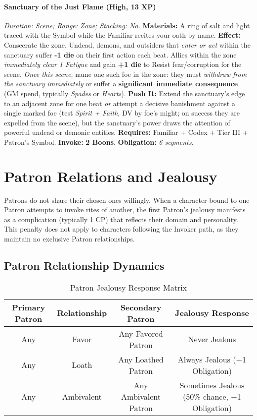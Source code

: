 \documentclass[12pt,twoside]{book}
\begin{document}
\paragraph{Sanctuary of the Just Flame (High, 13 XP)} \emph{Duration: Scene; Range: Zone; Stacking: No.}  
\textbf{Materials:} A ring of salt and light traced with the Symbol while the Familiar recites your oath by name.  
\textbf{Effect:} Consecrate the zone. Undead, demons, and outsiders that \emph{enter or act} within the sanctuary suffer \textbf{-1 die} on their first action each beat. Allies within the zone \emph{immediately clear 1 Fatigue} and gain \textbf{+1 die} to Resist fear/corruption for the scene. \emph{Once this scene,} name one such foe in the zone: they must \emph{withdraw from the sanctuary immediately} or suffer a \textbf{significant immediate consequence} (GM spend, typically \emph{Spades} or \emph{Hearts}).  
\textbf{Push It:} Extend the sanctuary's edge to an adjacent zone for one beat \emph{or} attempt a decisive banishment against a single marked foe (test \emph{Spirit + Faith}, DV by foe's might; on success they are expelled from the scene), but the sanctuary's power draws the attention of powerful undead or demonic entities.
\textbf{Requires:} Familiar + Codex + Tier III + Patron's Symbol. \;\; \textbf{Invoke:} \textbf{2 Boons}. \;\; \textbf{Obligation:} \emph{6 segments.}

\section{Patron Relations and Jealousy}

Patrons do not share their chosen ones willingly. When a character bound to one Patron attempts to invoke rites of another, the first Patron's jealousy manifests as a complication (typically 1 CP) that reflects their domain and personality. This penalty does not apply to characters following the Invoker path, as they maintain no exclusive Patron relationships.

\subsection{Patron Relationship Dynamics}

\begin{table}[htbp]
\centering
\begin{tabular}{|c|c|c|c|}
\hline
\textbf{Primary Patron} & \textbf{Relationship} & \textbf{Secondary Patron} & \textbf{Jealousy Response} \\
\hline
Any & Favor & Any Favored Patron & Never Jealous \\
\hline
Any & Loath & Any Loathed Patron & Always Jealous (+1 Obligation) \\
\hline
Any & Ambivalent & Any Ambivalent Patron & Sometimes Jealous (50\% chance, +1 Obligation) \\
\hline
\end{tabular}
\caption{Patron Jealousy Response Matrix}
\end{table}
\end{document}
